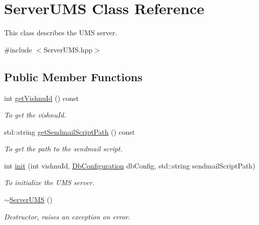 \hypertarget{classServerUMS}{
\section{ServerUMS Class Reference}
\label{classServerUMS}
}


This class describes the UMS server.  




{\ttfamily \#include $<$ServerUMS.hpp$>$}

\subsection*{Public Member Functions}
\begin{DoxyCompactItemize}
\item 
int \hyperlink{classServerUMS_af5943e226e5d3122ae98771f34cbef79}{getVishnuId} () const 
\begin{DoxyCompactList}\small\item\em To get the vishnuId. \item\end{DoxyCompactList}\item 
std::string \hyperlink{classServerUMS_aa8e658cdcdb326d25460948e5f5b91b9}{getSendmailScriptPath} () const 
\begin{DoxyCompactList}\small\item\em To get the path to the sendmail script. \item\end{DoxyCompactList}\item 
int \hyperlink{classServerUMS_a56a5c740db9e9c1b3e28fa4d0b05546b}{init} (int vishnuId, \hyperlink{classDbConfiguration}{DbConfiguration} dbConfig, std::string sendmailScriptPath)
\begin{DoxyCompactList}\small\item\em To initialize the UMS server. \item\end{DoxyCompactList}\item 
\hypertarget{classServerUMS_a9d94c92a660ecfda2930894dd4b772bf}{
\hyperlink{classServerUMS_a9d94c92a660ecfda2930894dd4b772bf}{$\sim$ServerUMS} ()}
\label{classServerUMS_a9d94c92a660ecfda2930894dd4b772bf}

\begin{DoxyCompactList}\small\item\em Destructor, raises an exception on error. \item\end{DoxyCompactList}\end{DoxyCompactItemize}
